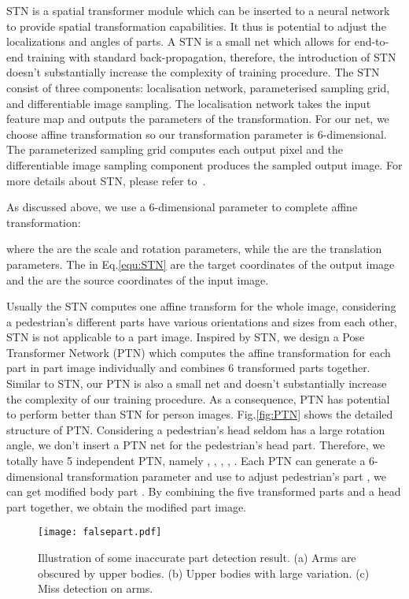 \documentclass[10pt,twocolumn,letterpaper]{article}
\begin{document}
STN is a spatial transformer module which can be inserted to a neural network to provide spatial transformation capabilities. It thus is potential to adjust the localizations and angles of parts. A STN is a small net which allows for end-to-end training with standard back-propagation, therefore, the introduction of STN doesn't substantially increase the complexity of training procedure. The STN consist of three components: localisation network, parameterised sampling grid, and differentiable image sampling. The localisation network takes the input feature map and outputs the parameters of the transformation. For our net, we choose affine transformation so our transformation parameter is 6-dimensional. The parameterized sampling grid computes each output pixel and the differentiable image sampling component produces the sampled output image. For more details about STN, please refer to~\cite{jaderberg2015spatial}.


As discussed above, we use a 6-dimensional parameter  to complete affine transformation:

where the  are the scale and rotation parameters, while the  are the translation parameters. The  in Eq.\ref{equ:STN} are the target coordinates of the output image and the  are the source coordinates of the input image.

Usually the STN computes one affine transform for the whole image, considering a pedestrian's different parts have various orientations and sizes from each other, STN is not applicable to a part image. Inspired by STN, we design a Pose Transformer Network (PTN) which computes the affine transformation for each part in part image individually and combines 6 transformed parts together. Similar to STN, our PTN is also a small net and doesn't substantially increase the complexity of our training procedure. As a consequence, PTN has potential to perform better than STN for person images. Fig.\ref{fig:PTN} shows the detailed structure of PTN. Considering a pedestrian's head seldom has a large rotation angle, we don't insert a PTN net for the pedestrian's head part. Therefore, we totally have 5 independent PTN, namely , , , , . Each PTN can generate a 6-dimensional transformation parameter  and use  to adjust pedestrian's part , we can get modified body part . By combining the five transformed parts and a head part together, we obtain the modified part image.

\begin{figure}[t]
\centering \texttt{[image: falsepart.pdf]}\\
\vspace{-2mm}
\caption{ Illustration of some inaccurate part detection result. (a) Arms are obscured by upper bodies. (b) Upper bodies with large variation. (c) Miss detection on arms.}
\vspace{-4mm}
\label{fig:falsepart}
\end{figure}
\end{document}
